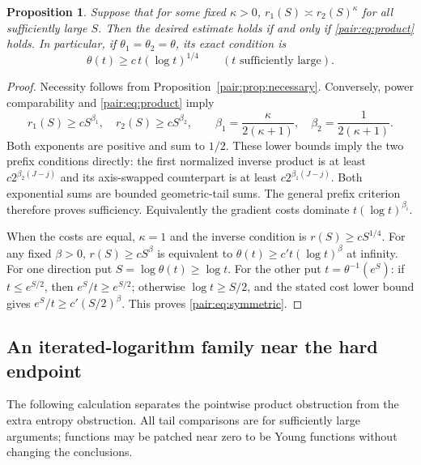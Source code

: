 \documentclass[11pt]{article}
\newtheorem{proposition}[theorem]{Proposition}
\numberwithin{equation}{section}
\begin{document}
\begin{proposition}\label{pair:prop:power-comparable}
Suppose that for some fixed \(\kappa>0\),
\(r_1(S)\asymp r_2(S)^\kappa\) for all sufficiently large \(S\).
Then the desired estimate holds if and only if
\eqref{pair:eq:product} holds.  In particular, if
\(\theta_1=\theta_2=\theta\), its exact condition is
\[
 \theta(t)\ge c\,t(\log t)^{1/4}
 \qquad(t\text{ sufficiently large}).
 \tag{P10}\label{pair:eq:symmetric}
\]
\end{proposition}
\begin{proof}
Necessity follows from Proposition~\ref{pair:prop:necessary}.
Conversely, power comparability and \eqref{pair:eq:product} imply
\[
 r_1(S)\ge cS^{\beta_1},\quad
 r_2(S)\ge cS^{\beta_2},\qquad
 \beta_1=\frac{\kappa}{2(\kappa+1)},\quad
 \beta_2=\frac1{2(\kappa+1)}.
\]
Both exponents are positive and sum to \(1/2\).
These lower bounds imply the two prefix conditions directly: the
first normalized inverse product is at least
$c2^{\beta_2(J-j)}$ and its axis-swapped counterpart is at least
$c2^{\beta_1(J-j)}$. Both exponential sums are bounded geometric-tail
sums. The general prefix criterion therefore proves sufficiency.
Equivalently the gradient costs dominate
\(t(\log t)^{\beta_i}\).

When the costs are equal, \(\kappa=1\) and the inverse condition is
\(r(S)\ge cS^{1/4}\).  For any fixed \(\beta>0\),
\(r(S)\ge cS^\beta\) is equivalent to
\(\theta(t)\ge c't(\log t)^\beta\) at infinity.  For one direction
put \(S=\log\theta(t)\ge\log t\).  For the other put
\(t=\theta^{-1}(e^S)\): if \(t\le e^{S/2}\), then
\(e^S/t\ge e^{S/2}\); otherwise \(\log t\ge S/2\), and the stated
cost lower bound gives \(e^S/t\ge c'(S/2)^\beta\).
This proves \eqref{pair:eq:symmetric}.
\end{proof}

\subsection{An iterated-logarithm family near the hard endpoint}

The following calculation separates the pointwise product obstruction
from the extra entropy obstruction.  All tail comparisons are for
sufficiently large arguments; functions may be patched near zero to be
Young functions without changing the conclusions.
\end{document}
